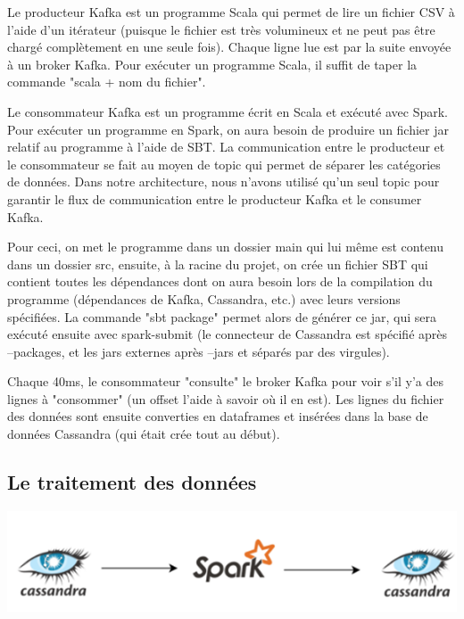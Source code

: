 \documentclass[a4paper, 11pt, titlepage]{article}
\begin{document}
Le producteur Kafka est un programme Scala qui permet de lire un fichier CSV à l'aide d'un itérateur (puisque le fichier est très volumineux et ne peut pas être chargé complètement en une seule fois). Chaque ligne lue est par la suite envoyée à un broker Kafka. Pour exécuter un programme Scala, il suffit de taper la commande "scala + nom du fichier".

Le consommateur Kafka est un programme écrit en Scala et exécuté avec Spark. Pour exécuter un programme en Spark, on aura besoin de produire un fichier jar relatif au programme à l'aide de SBT.  La communication entre le producteur et le consommateur se fait au moyen de topic qui permet de séparer les catégories de données. Dans notre architecture, nous n'avons utilisé qu'un seul topic pour garantir le flux de communication entre le producteur Kafka et le consumer Kafka.

Pour ceci, on met le programme dans un dossier main qui lui même est contenu dans un dossier src, ensuite, à la racine du projet, on crée un fichier SBT qui contient toutes les dépendances dont on aura besoin lors de la compilation du programme (dépendances de Kafka, Cassandra, etc.) avec leurs versions spécifiées. La commande "sbt package" permet alors de générer ce jar, qui sera exécuté ensuite avec spark-submit (le connecteur de Cassandra est spécifié après --packages, et les jars externes après --jars et séparés par des virgules).

Chaque 40ms, le consommateur "consulte" le broker Kafka pour voir s'il y'a des lignes à "consommer" (un offset l'aide à savoir où il en est). Les lignes du fichier des données sont ensuite converties en dataframes et insérées dans la base de données Cassandra (qui était crée tout au début).
 

\subsection {Le traitement des données}

\begin{center}
    \includegraphics[scale=0.55]{res/demo2.png}
\end{center}
\end{document}
